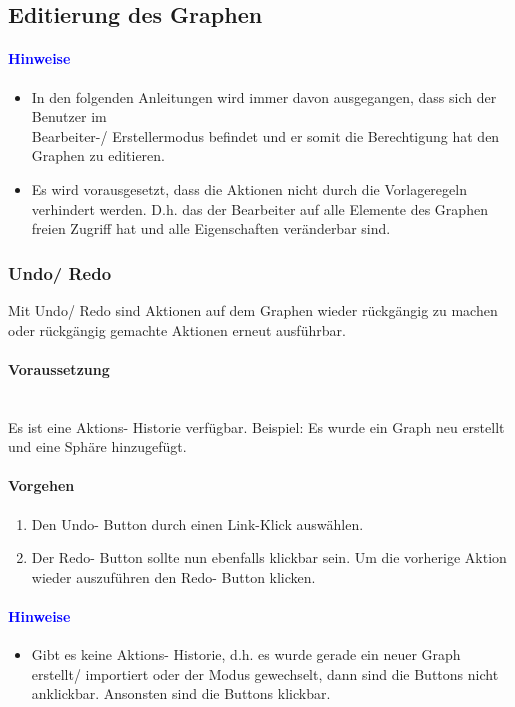 \documentclass[enabledeprecatedfontcommands,fontsize=11pt,paper=a4,twoside]{scrartcl}
\newcounter{one}
\newcommand*{\hint}{\paragraph{\textcolor{blue}{Hinweise}}}
\newcommand*{\condition}{\paragraph{Voraussetzung}$\;$ \vspace{0.2cm}\\}
\newcommand*{\action}{\paragraph{Vorgehen}}
\begin{document}
	\subsection{Editierung des Graphen}\label{edit}
		\hint
		\begin{itemize}
			\item In den folgenden Anleitungen wird immer davon ausgegangen, dass sich der Benutzer im \\
			Bearbeiter-/ Erstellermodus befindet und er somit die Berechtigung hat den Graphen zu editieren.
			\item Es wird vorausgesetzt, dass die Aktionen nicht durch die Vorlageregeln verhindert werden. D.h. das der Bearbeiter auf alle Elemente des Graphen freien Zugriff hat und alle Eigenschaften veränderbar sind.
		\end{itemize}
		\subsubsection{Undo/ Redo}
		Mit Undo/ Redo sind Aktionen auf dem Graphen wieder rückgängig zu machen oder rückgängig gemachte Aktionen erneut ausführbar. 
		\condition
		Es ist eine Aktions- Historie verfügbar. Beispiel: Es wurde ein Graph neu erstellt und eine Sphäre hinzugefügt. 	
		\action
		\begin{enumerate}
			\item Den Undo- Button durch einen Link-Klick auswählen. 
			\item Der Redo- Button sollte nun ebenfalls klickbar sein. Um die vorherige Aktion wieder auszuführen den Redo- Button klicken. 
		\end{enumerate}			
		\hint
		\begin{itemize}
			\item Gibt es keine Aktions- Historie, d.h. es wurde gerade ein neuer Graph erstellt/ importiert oder der Modus gewechselt, dann sind die Buttons nicht anklickbar. Ansonsten sind die Buttons klickbar.
		\end{itemize}
\end{document}
